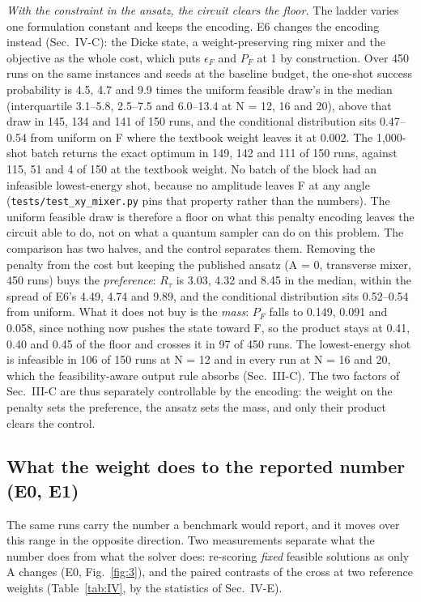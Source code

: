 \documentclass{ieeeaccess}
\begin{document}
\textit{With the constraint in the ansatz, the circuit clears the floor.} The ladder varies one formulation constant and keeps the encoding. E6 changes the encoding instead (Sec.~IV-C): the Dicke state, a weight-preserving ring mixer and the objective as the whole cost, which puts $\epsilon_{F}$ and $P_{F}$ at 1 by construction. Over 450 runs on the same instances and seeds at the baseline budget, the one-shot success probability is 4.5, 4.7 and 9.9 times the uniform feasible draw's in the median (interquartile 3.1--5.8, 2.5--7.5 and 6.0--13.4 at N = 12, 16 and 20), above that draw in 145, 134 and 141 of 150 runs, and the conditional distribution sits 0.47--0.54 from uniform on F where the textbook weight leaves it at 0.002. The 1,000-shot batch returns the exact optimum in 149, 142 and 111 of 150 runs, against 115, 51 and 4 of 150 at the textbook weight. No batch of the block had an infeasible lowest-energy shot, because no amplitude leaves F at any angle (\texttt{tests/test\_xy\_mixer.py} pins that property rather than the numbers). The uniform feasible draw is therefore a floor on what this penalty encoding leaves the circuit able to do, not on what a quantum sampler can do on this problem. The comparison has two halves, and the control separates them. Removing the penalty from the cost but keeping the published ansatz (A = 0, transverse mixer, 450 runs) buys the \textit{preference}: $R_{\tau}$ is 3.03, 4.32 and 8.45 in the median, within the spread of E6's 4.49, 4.74 and 9.89, and the conditional distribution sits 0.52--0.54 from uniform. What it does not buy is the \textit{mass}: $P_{F}$ falls to 0.149, 0.091 and 0.058, since nothing now pushes the state toward F, so the product stays at 0.41, 0.40 and 0.45 of the floor and crosses it in 97 of 450 runs. The lowest-energy shot is infeasible in 106 of 150 runs at N = 12 and in every run at N = 16 and 20, which the feasibility-aware output rule absorbs (Sec.~III-C). The two factors of Sec.~III-C are thus separately controllable by the encoding: the weight on the penalty sets the preference, the ansatz sets the mass, and only their product clears the control.


\subsection{What the weight does to the reported number (E0, E1)}


The same runs carry the number a benchmark would report, and it moves over this range in the opposite direction. Two measurements separate what the number does from what the solver does: re-scoring \textit{fixed} feasible solutions as only A changes (E0, Fig.~\ref{fig:3}), and the paired contrasts of the cross at two reference weights (Table~\ref{tab:IV}, by the statistics of Sec.~IV-E).
\end{document}
